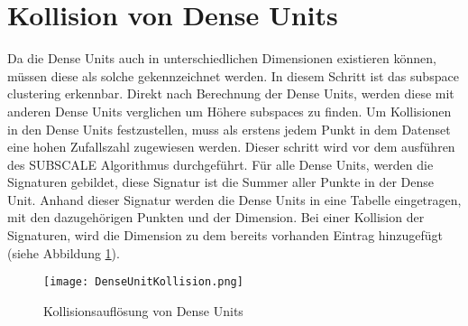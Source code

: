 \section{Kollision von Dense Units}

Da die Dense Units auch in unterschiedlichen Dimensionen existieren können, müssen diese als solche gekennzeichnet werden. In diesem Schritt ist das subspace clustering erkennbar. Direkt nach Berechnung der Dense Units, werden diese mit anderen Dense Units verglichen um Höhere subspaces zu finden. Um Kollisionen in den Dense Units festzustellen, muss als erstens jedem Punkt in dem Datenset eine hohen Zufallszahl zugewiesen werden.  Dieser schritt wird vor dem ausführen des SUBSCALE Algorithmus durchgeführt. Für alle Dense Units, werden die Signaturen gebildet, diese Signatur ist die Summer aller Punkte in der Dense Unit. Anhand dieser Signatur werden die Dense Units in eine Tabelle eingetragen, mit den dazugehörigen Punkten und der Dimension. Bei einer Kollision der Signaturen, wird die Dimension zu dem bereits vorhanden Eintrag hinzugefügt (siehe Abbildung \ref{dense-collision}). \cite{Ramin}

\begin{figure}
	\centering
	\texttt{[image: DenseUnitKollision.png]}
	\caption{Kollisionsauflösung von Dense Units}
	\label{dense-collision}
\end{figure}

